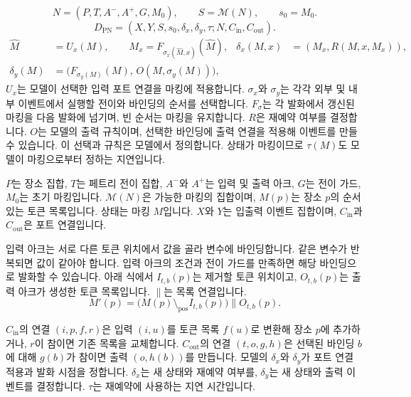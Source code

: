 \documentclass[11pt,a4paper]{article}
\newcommand{\chaptermark}[1]{\par\noindent{\LARGE\color{ink}\bfseries #1}\par\smallskip}
\begin{document}
\newpage
\chaptermark{2.3 \enspace DEVSPetriNet}
\begin{equation}\label{eq:devs-petri}
N=(P,T,A^-,A^+,G,M_0),\qquad
S=\mathcal M(N),\qquad s_0=M_0.
\end{equation}
\begin{equation}\label{eq:devs-petri-model}
D_{\mathrm{PN}}=(X,Y,S,s_0,\delta_x,\delta_y,\tau;
                  N,C_{\mathrm{in}},C_{\mathrm{out}}).
\end{equation}
\begin{align}
\widehat M &= U_x(M), \qquad M_x=F_{\sigma_x(\widehat M,x)}(\widehat M),
   &\delta_x(M,x)&=(M_x,R(M,x,M_x)),\label{eq:petri-delta-x}\\
\delta_y(M)&=\bigl(F_{\sigma_y(M)}(M),\,O(M,\sigma_y(M))\bigr),
   &&\label{eq:petri-delta-y}
\end{align}
$U_x$는 모델이 선택한 입력 포트 연결을 마킹에 적용합니다.
$\sigma_x$와 $\sigma_y$는 각각 외부 및 내부 이벤트에서 실행할
전이와 바인딩의 순서를 선택합니다. $F_\sigma$는 각 발화에서
갱신된 마킹을 다음 발화에 넘기며, 빈 순서는 마킹을 유지합니다.
$R$은 재예약 여부를 결정합니다. $O$는 모델의 출력 규칙이며,
선택한 바인딩에 출력 연결을 적용해 이벤트를 만들 수 있습니다.
이 선택과 규칙은 모델에서 정의합니다. 상태가 마킹이므로
$\tau(M)$도 모델이 마킹으로부터 정하는 지연입니다.

$P$는 장소 집합, $T$는 페트리 전이 집합, $A^-$와 $A^+$는
입력 및 출력 아크, $G$는 전이 가드, $M_0$는 초기 마킹입니다.
$\mathcal M(N)$은 가능한 마킹의 집합이며, $M(p)$는 장소 $p$의
순서 있는 토큰 목록입니다.
상태는 마킹 $M$입니다. $X$와 $Y$는 입출력
이벤트 집합이며, $C_{\mathrm{in}}$과 $C_{\mathrm{out}}$은 포트 연결입니다.

입력 아크는 서로 다른 토큰 위치에서 값을 골라 변수에 바인딩합니다.
같은 변수가 반복되면 값이 같아야 합니다. 입력 아크의 조건과
전이 가드를 만족하면 해당 바인딩으로 발화할 수 있습니다.
아래 식에서 $I_{t,b}(p)$는 제거할 토큰 위치이고,
$O_{t,b}(p)$는 출력 아크가 생성한 토큰 목록입니다. $\|$는 목록 연결입니다.
\begin{equation}\label{eq:petri-fire}
M'(p)=\bigl(M(p)\setminus_{\mathrm{pos}} I_{t,b}(p)\bigr)
       \mathbin{\|} O_{t,b}(p).
\end{equation}


$C_{\mathrm{in}}$의 연결 $(i,p,f,r)$은 입력 $(i,u)$를 토큰 목록
$f(u)$로 변환해 장소 $p$에 추가하거나, $r$이 참이면 기존 목록을
교체합니다. $C_{\mathrm{out}}$의 연결 $(t,o,g,h)$은 선택된 바인딩
$b$에 대해 $g(b)$가 참이면 출력 $(o,h(b))$를 만듭니다.
모델의 $\delta_x$와 $\delta_y$가 포트 연결 적용과 발화 시점을 정합니다.
$\delta_x$는 새 상태와 재예약 여부를, $\delta_y$는 새 상태와 출력
이벤트를 결정합니다. $\tau$는 재예약에 사용하는 지연 시간입니다.
\end{document}
